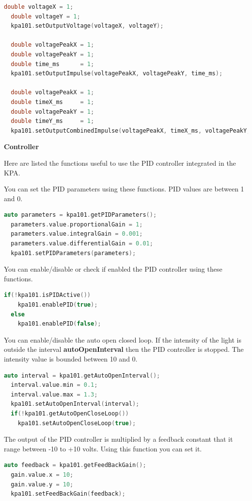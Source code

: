 \begin{lstlisting}[language=c++, gobble=2]
  double voltageX = 1;
  double voltageY = 1;
  kpa101.setOutputVoltage(voltageX, voltageY);

  double voltagePeakX = 1;
  double voltagePeakY = 1;
  double time_ms      = 1;
  kpa101.setOutputImpulse(voltagePeakX, voltagePeakY, time_ms);

  double voltagePeakX = 1;
  double timeX_ms     = 1;
  double voltagePeakY = 1;
  double timeY_ms     = 1;
  kpa101.setOutputCombinedImpulse(voltagePeakX, timeX_ms, voltagePeakY, timeY_ms);
\end{lstlisting}

\textbf{Controller}

Here are listed the functions useful to use the PID controller
integrated in the KPA.

You can set the PID parameters using these functions. PID values are
between 1 and 0.

\begin{lstlisting}[language=c++, gobble=2]
  auto parameters = kpa101.getPIDParameters();
  parameters.value.proportionalGain = 1;
  parameters.value.integralGain = 0.001;
  parameters.value.differentialGain = 0.01;
  kpa101.setPIDParameters(parameters);
\end{lstlisting}

You can enable/disable or check if enabled the PID controller using
these functions.

\begin{lstlisting}[language=c++, gobble=2]
  if(!kpa101.isPIDActive())
    kpa101.enablePID(true);
  else
    kpa101.enablePID(false);
\end{lstlisting}

You can enable/disable the auto open closed loop. If the intensity of
the light is outside the interval \textbf{autoOpenInterval} then the PID
controller is stopped. The intensity value is bounded between 10 and 0.

\begin{lstlisting}[language=c++, gobble=2]
  auto interval = kpa101.getAutoOpenInterval();
  interval.value.min = 0.1;
  interval.value.max = 1.3;
  kpa101.setAutoOpenInterval(interval);
  if(!kpa101.getAutoOpenCloseLoop())
    kpa101.setAutoOpenCloseLoop(true);
\end{lstlisting}

The output of the PID controller is multiplied by a feedback constant
that it range between -10 to +10 volts. Using this function you can set
it.

\begin{lstlisting}[language=c++, gobble=2]
  auto feedback = kpa101.getFeedBackGain();
  gain.value.x = 10;
  gain.value.y = 10;
  kpa101.setFeedBackGain(feedback);
\end{lstlisting}


